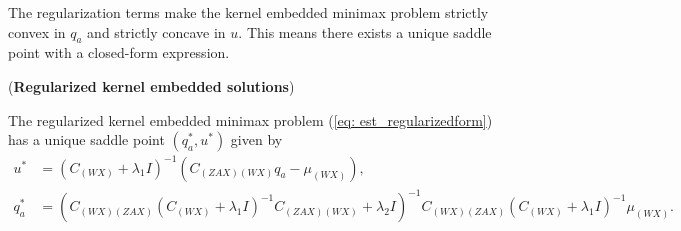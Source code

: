 The regularization terms make the kernel embedded minimax problem strictly convex in $q_a$ and strictly concave in $u$. 
This means there exists a unique saddle point with a closed-form expression. 

\begin{theorem}(\textbf{Regularized kernel embedded solutions})

    \label{thm: est_regularizedform}
    The regularized kernel embedded minimax problem (\ref{eq: est_regularizedform}) has a unique saddle point $(q_a^*,u^*)$ given by 
    \begin{align*}
        u^* &= (C_{(WX)}+\lambda_1I)^{-1}(C_{(ZAX)(WX)}q_a-\mu_{(WX)}), \\
        q_a^* &= (C_{(WX)(ZAX)}(C_{(WX)}+\lambda_1I)^{-1}C_{(ZAX)(WX)}+\lambda_2I)^{-1}C_{(WX)(ZAX)}(C_{(WX)}+\lambda_1I)^{-1}\mu_{(WX)}.
    \end{align*} 
\end{theorem}
